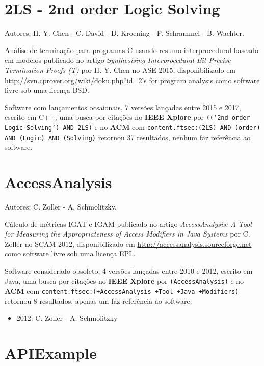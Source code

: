

\label{softwares-summary}

\section{2LS - 2nd order Logic Solving}

Autores:
H. Y. Chen - C. David - D. Kroening - P. Schrammel - B. Wachter.

Análise de terminação para programas C usando resumo interprocedural baseado em modelos
publicado no artigo {\it Synthesising Interprocedural Bit-Precise Termination Proofs (T)}
por H. Y. Chen
no ASE 2015,
disponibilizado em \url{http://svn.cprover.org/wiki/doku.php?id=2ls for program analysis}
como software livre
sob uma licença BSD.

Software com lançamentos ocsaionais,
7 versões lançadas
entre 2015 e 2017,
escrito em C++,
uma busca por citações no {\bf IEEE Xplore} por
\texttt{(('2nd order Logic Solving') AND 2LS)}
e no {\bf ACM} com
\texttt{content.ftsec:(2LS) AND (order) AND (Logic) AND (Solving)}
retornou
37 resultados,
nenhum faz referência ao software.


\section{AccessAnalysis}

Autores:
C. Zoller - A. Schmolitzky.

Cálculo de métricas IGAT e IGAM
publicado no artigo {\it AccessAnalysis: A Tool for Measuring the Appropriateness of Access Modifiers in Java Systems}
por C. Zoller
no SCAM 2012,
disponibilizado em \url{http://accessanalysis.sourceforge.net}
como software livre
sob uma licença EPL.

Software considerado obsoleto,
4 versões lançadas
entre 2010 e 2012,
escrito em Java,
uma busca por citações no {\bf IEEE Xplore} por
\texttt{(AccessAnalysis)}
e no {\bf ACM} com
\texttt{content.ftsec:(+AccessAnalysis +Tool +Java +Modifiers)}
retornou
8 resultados,
apenas um faz referência ao software.

\begin{itemize}
\item 2012: C. Zoller - A. Schmolitzky
\end{itemize}

\section{APIExample}

